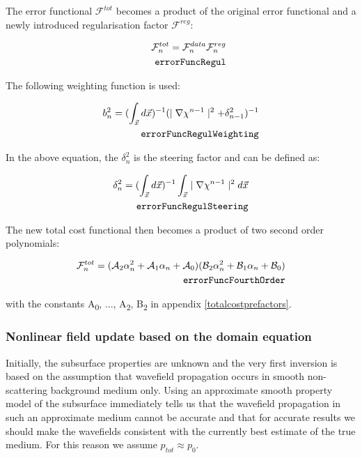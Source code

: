 \documentclass[10pt,a4paper]{article}
\begin{document}
The error functional $\mathcal{F}^{tot}$ becomes a product of the
original error functional and a newly introduced regularisation factor
$\mathcal{F}^{reg}$:

\begin{align} \label{eq:errorFuncRegul} \mathcal{F}^{tot}_n =
\mathcal{F}^{data}_n \mathcal{F}^{reg}_n\\
\tag*{\texttt{errorFuncRegul}}
\end{align}

The following weighting function is used:

\begin{align} \label{eq:errorFuncRegulWeighting} b_n^{2} = (\int_{\vec{x}}
d\vec{x})^{-1} (\mid\nabla\chi^{n-1}\mid^2 + \delta_{n-1}^2)^{-1}\\
\tag*{\texttt{errorFuncRegulWeighting}}
\end{align}

In the above equation, the $\delta_{n}^2$ is the steering factor and
can be defined as:

\begin{align} \label{eq:errorFuncRegulSteering} \delta_{n}^2 = (\int_{\vec{x}}
d\vec{x})^{-1} \int_{\vec{x}} \mid\nabla\chi^{n-1}\mid^2 d\vec{x}\\
\tag*{\texttt{errorFuncRegulSteering}}
\end{align}

The new total cost functional then becomes a
product of two second order
polynomials:

\begin{align} \label{eq:errorFuncFourthOrder} \mathcal{F}^{tot}_n =
(\mathcal{A}_2\alpha^{2}_n + \mathcal{A}_1\alpha_n
+\mathcal{A}_0)(\mathcal{B}_2\alpha^{2}_n + \mathcal{B}_1\alpha_n +
\mathcal{B}_0)\\
\tag*{\texttt{errorFuncFourthOrder}}
\end{align}

with the constants A\textsubscript{0}, ...,
A\textsubscript{2}, B\textsubscript{2} in appendix
\ref{totalcostprefactors}.

\subsubsection{Nonlinear field update based on the domain equation}
\label{nonlinfupdate}
Initially, the subsurface properties are unknown  and the very first
inversion is based on the assumption that wavefield propagation occurs
in smooth non-scattering background medium only.
Using an approximate smooth property model of the subsurface
immediately tells us that the wavefield propagation in such an
approximate medium cannot be accurate and that for accurate
results we should make the wavefields consistent with the currently
best estimate of the true medium. For this reason we assume $p_{tot}
\approx p_0$.
\end{document}
